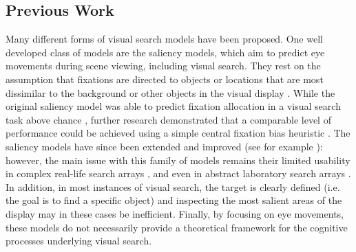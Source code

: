 \documentclass[preprint,12pt,authoryear]{elsarticle}
\begin{document}
\subsection{Previous Work}

Many different forms of visual search models have been proposed. One well developed class of models are the saliency models, which aim to predict eye movements during scene viewing, including visual search. They rest on the assumption that fixations are directed to objects or locations that are most dissimilar to the background or other objects in the visual display \citep{itti2000saliency, itti1998model, koch1987shifts}. While the original saliency model was able to predict fixation allocation in a visual search task above chance \citep{parkhurst2002modeling}, further research demonstrated that a comparable level of performance could be achieved using a simple central fixation bias heuristic \citep{tatler2007central}. The saliency models have since been extended and improved (see for example \cite{zhang2008sun}): however, the main issue with this family of models remains their limited usability in complex real-life search arrays \citep{tatler2011eye, koehler2014saliency}, and even in abstract laboratory search arrays \citep{kotseruba2020saliency}. In addition, in most instances of visual search, the target is clearly defined (i.e. the goal is to find a specific object) and inspecting the most salient areas of the display may in these cases be inefficient. Finally, by focusing on eye movements, these models do not necessarily provide a theoretical framework for the cognitive processes underlying visual search.
\end{document}
